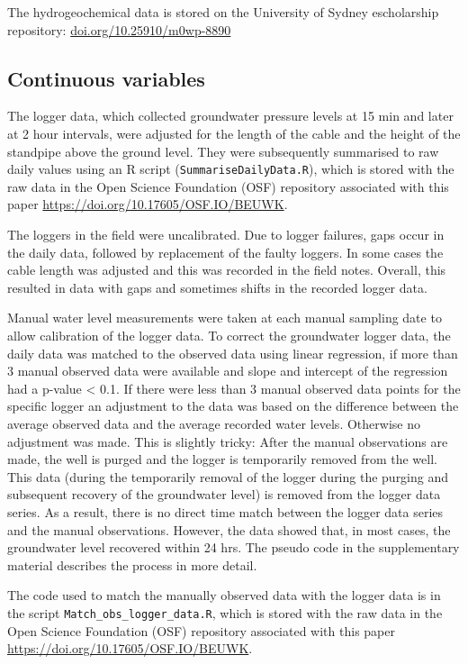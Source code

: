 \documentclass[, manuscript]{copernicus}
\begin{document}
The hydrogeochemical data is stored on the University of Sydney
escholarship repository: \url{doi.org/10.25910/m0wp-8890}

\subsection{Continuous variables}

The logger data, which collected groundwater pressure levels at 15 min
and later at 2 hour intervals, were adjusted for the length of the cable
and the height of the standpipe above the ground level. They were
subsequently summarised to raw daily values using an R script
(\texttt{SummariseDailyData.R}), which is stored with the raw data in
the Open Science Foundation (OSF) repository associated with this paper
\url{https://doi.org/10.17605/OSF.IO/BEUWK}.

The loggers in the field were uncalibrated. Due to logger failures, gaps
occur in the daily data, followed by replacement of the faulty loggers.
In some cases the cable length was adjusted and this was recorded in the
field notes. Overall, this resulted in data with gaps and sometimes
shifts in the recorded logger data.

Manual water level measurements were taken at each manual sampling date
to allow calibration of the logger data. To correct the groundwater
logger data, the daily data was matched to the observed data using
linear regression, if more than 3 manual observed data were available
and slope and intercept of the regression had a p-value \textless{} 0.1.
If there were less than 3 manual observed data points for the specific
logger an adjustment to the data was based on the difference between the
average observed data and the average recorded water levels. Otherwise
no adjustment was made. This is slightly tricky: After the manual
observations are made, the well is purged and the logger is temporarily
removed from the well. This data (during the temporarily removal of the
logger during the purging and subsequent recovery of the groundwater
level) is removed from the logger data series. As a result, there is no
direct time match between the logger data series and the manual
observations. However, the data showed that, in most cases, the
groundwater level recovered within 24 hrs. The pseudo code in the
supplementary material describes the process in more detail.

The code used to match the manually observed data with the logger data
is in the script \texttt{Match\_obs\_logger\_data.R}, which is stored
with the raw data in the Open Science Foundation (OSF) repository
associated with this paper \url{https://doi.org/10.17605/OSF.IO/BEUWK}.
\end{document}
